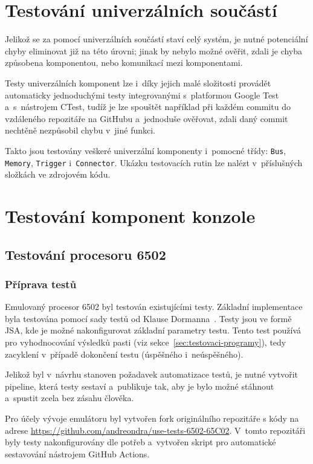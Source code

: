 \section{Testování univerzálních součástí}
Jelikož se za pomocí univerzálních součástí staví celý systém, je nutné potenciální chyby eliminovat již na této úrovni; jinak by nebylo možné ověřit, zdali je chyba způsobena komponentou, nebo komunikací mezi komponentami.

Testy univerzálních komponent lze i~díky jejich malé složitosti provádět automaticky jednoduchými testy integrovanými s~platformou Google Test a~s~nástrojem CTest, tudíž je lze spouštět například při každém commitu do vzdáleného repozitáře na GitHubu a~jednoduše ověřovat, zdali daný commit nechtěně nezpůsobil chybu v~jiné funkci.

Takto jsou testovány veškeré univerzální komponenty i~pomocné třídy: \texttt{Bus}, \texttt{Memory}, \texttt{Trigger} i~\texttt{Connector}. Ukázku testovacích rutin lze nalézt v~příslušných složkách ve zdrojovém kódu.

\section{Testování komponent konzole}
\subsection{Testování procesoru 6502}
\label{sec:test-procesor}
\subsubsection{Příprava testů}
Emulovaný procesor 6502 byl testován existujícími testy. Základní implementace byla testována pomocí sady testů od Klause Dormanna~\cite{Dormann2020:6502-testy}. Testy jsou ve formě JSA, kde je možné nakonfigurovat základní parametry testu. Tento test používá pro vyhodnocování výsledků pasti (viz sekce~\ref{sec:testovaci-programy}), tedy zacyklení v~případě dokončení testu (úspěšného i~neúspěšného).

Jelikož byl v~návrhu stanoven požadavek automatizace testů, je nutné vytvořit pipeline, která testy sestaví a~publikuje tak, aby je bylo možné stáhnout a~spustit zcela bez zásahu člověka.

Pro účely vývoje emulátoru byl vytvořen fork originálního repozitáře s kódy na adrese \url{https://github.com/andreondra/use-tests-6502-65C02}. V~tomto repozitáři byly testy nakonfigurovány dle potřeb a~vytvořen skript pro automatické sestavování nástrojem GitHub Actions.

